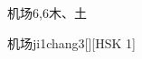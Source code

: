 \begin{entry}{机场}{6,6}{⽊、⼟}
  \begin{phonetics}{机场}{ji1chang3}[][HSK 1]
  \end{phonetics}
\end{entry}
